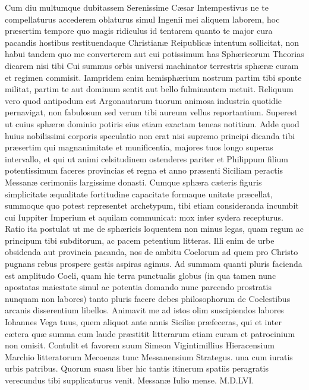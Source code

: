 \documentclass[11pt,a4paper]{article}
\begin{document}
Cum diu multumque dubitassem Serenissime Cæsar Intempestivus ne te compellaturus accederem oblaturus simul Ingenii mei aliquem laborem, hoc præsertim tempore quo  magis ridiculus id tentarem quanto te major cura pacandis hostibus restituendaque Christianæ Reipublicæ intentum sollicitat, non habui tandem quo me converterem aut cui potissimum has Sphæricorum Theorias dicarem nisi tibi Cui summus orbis universi machinator terrestris sphæræ curam et regimen commisit. Iampridem enim hemisphærium nostrum partim tibi sponte militat, partim te aut dominum sentit aut bello fulminantem metuit. Reliquum vero quod antipodum est Argonautarum tuorum animosa industria quotidie pernavigat, non fabulosum sed verum tibi aureum vellus reportantium. Superest ut cuius sphæræ dominio potiris eius etiam exactam teneas notitiam. Adde quod huius nobilissimi corporis speculatio non erat nisi supremo principi dicanda tibi præsertim qui magnanimitate et munificentia, majores tuos longo superas intervallo, et qui ut animi celsitudinem ostenderes pariter et Philippum filium potentissimum faceres provincias et regna et anno præsenti Siciliam peractis Messanæ cerimoniis largissime donasti. Cumque sphæra cæteris figuris simplicitate æqualitate fortitudine capacitate formaque unitate præcellat, summoque quo potest representet archetypum, tibi etiam consideranda incumbit cui Iuppiter Imperium et aquilam communicat: mox inter sydera recepturus. Ratio ita postulat ut me de sphæricis loquentem non minus legas, quam regum ac principum tibi subditorum, ac pacem petentium litteras. Illi enim de urbe obsidenda aut provincia pacanda, nos de ambitu Coelorum ad quem pro Christo pugnans rebus prospere gestis aspiras agimus. Ad summam quanti pluris facienda est amplitudo Coeli, quam hic terra punctualis globus (in qua tamen nunc apostatas maiestate simul ac potentia domando nunc parcendo prostratis nunquam non labores) tanto pluris facere debes philosophorum de Coelestibus arcanis disserentium libellos. Animavit me ad istos olim suscipiendos labores Iohannes Vega tuus, quem aliquot ante annis Siciliæ præfeceras, qui et inter cætera quæ summa cum laude præstitit litterarum etiam curam et patrocinium non omisit. Contulit et favorem suum Simeon Vigintimillius Hieracensium Marchio litteratorum Mecoenas tunc Messanensium Strategus. una cum iuratis urbis patribus. Quorum suasu liber hic tantis itinerum spatiis peragratis verecundus tibi supplicaturus venit. Messanæ Iulio mense. M.D.LVI\ill{}.
\end{document}
